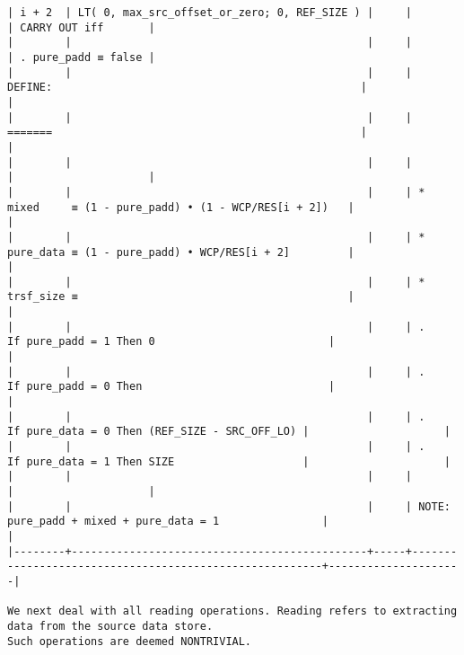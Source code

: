 \documentclass[varwidth=\maxdimen,margin=0.5cm,multi={verbatim}]{standalone}
\begin{document}
\begin{verbatim}
| i + 2  | LT( 0, max_src_offset_or_zero; 0, REF_SIZE ) |     |                                                        | CARRY OUT iff       |
|        |                                              |     |                                                        | . pure_padd ≡ false |
|        |                                              |     | DEFINE:                                                |                     |
|        |                                              |     | =======                                                |                     |
|        |                                              |     |                                                        |                     |
|        |                                              |     | * mixed     ≡ (1 - pure_padd) • (1 - WCP/RES[i + 2])   |                     |
|        |                                              |     | * pure_data ≡ (1 - pure_padd) • WCP/RES[i + 2]         |                     |
|        |                                              |     | * trsf_size ≡                                          |                     |
|        |                                              |     | .    If pure_padd = 1 Then 0                           |                     |
|        |                                              |     | .    If pure_padd = 0 Then                             |                     |
|        |                                              |     | .        If pure_data = 0 Then (REF_SIZE - SRC_OFF_LO) |                     |
|        |                                              |     | .        If pure_data = 1 Then SIZE                    |                     |
|        |                                              |     |                                                        |                     |
|        |                                              |     | NOTE: pure_padd + mixed + pure_data = 1                |                     |
|--------+----------------------------------------------+-----+--------------------------------------------------------+---------------------|

We next deal with all reading operations. Reading refers to extracting data from the source data store.
Such operations are deemed NONTRIVIAL.


\end{verbatim}
\end{document}
